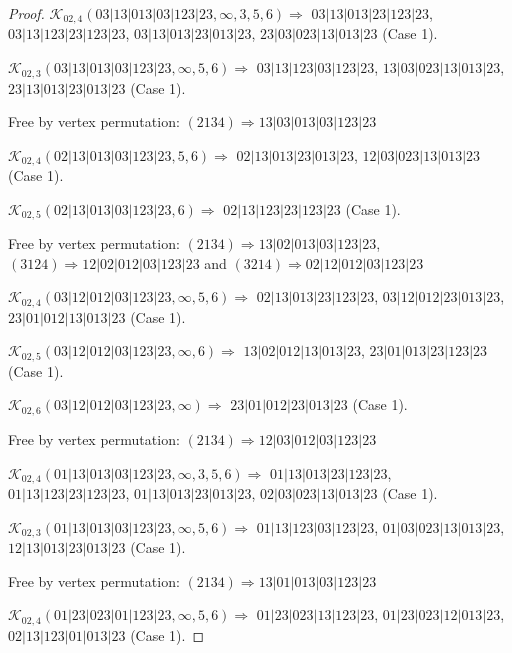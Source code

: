 \documentclass[12pt]{article}
\theoremstyle{plain}
\theoremstyle{definition}
\theoremstyle{remark}
\newcommand{\fancy}[1]{\mathcal{#1}}
\def\K{\fancy{K}}
\begin{document}
\begin{proof}
	$\K_{02,4}(03|13|013|03|123|23,\infty,3, 5, 6)\Rightarrow $ $03|13|013|23|123|23$, $03|13|123|23|123|23$, $03|13|013|23|013|23$, $23|03|023|13|013|23$ (Case 1).
	
	$\K_{02,3}(03|13|013|03|123|23,\infty,5, 6)\Rightarrow $ $03|13|123|03|123|23$, $13|03|023|13|013|23$, $23|13|013|23|013|23$ (Case 1).
	
	
	
	Free by vertex permutation: $(2 1 3 4)\Rightarrow 13|03|013|03|123|23$
	
	
	
	\bigskip
	
	$\K_{02,4}(02|13|013|03|123|23,5, 6)\Rightarrow $ $02|13|013|23|013|23$, $12|03|023|13|013|23$ (Case 1).
	
	$\K_{02,5}(02|13|013|03|123|23,6)\Rightarrow $ $02|13|123|23|123|23$ (Case 1).
	
	
	
	Free by vertex permutation: $(2 1 3 4)\Rightarrow 13|02|013|03|123|23$, $(3 1 2 4)\Rightarrow 12|02|012|03|123|23$ and $(3 2 1 4)\Rightarrow 02|12|012|03|123|23$
	
	
	
	\bigskip
	
	$\K_{02,4}(03|12|012|03|123|23,\infty,5, 6)\Rightarrow $ $02|13|013|23|123|23$, $03|12|012|23|013|23$, $23|01|012|13|013|23$ (Case 1).
	
	$\K_{02,5}(03|12|012|03|123|23,\infty,6)\Rightarrow $ $13|02|012|13|013|23$, $23|01|013|23|123|23$ (Case 1).
	
	$\K_{02,6}(03|12|012|03|123|23,\infty)\Rightarrow $ $23|01|012|23|013|23$ (Case 1).
	
	
	
	Free by vertex permutation: $(2 1 3 4)\Rightarrow 12|03|012|03|123|23$
	
	
	
	\bigskip
	
	$\K_{02,4}(01|13|013|03|123|23,\infty,3, 5, 6)\Rightarrow $ $01|13|013|23|123|23$, $01|13|123|23|123|23$, $01|13|013|23|013|23$, $02|03|023|13|013|23$ (Case 1).
	
	$\K_{02,3}(01|13|013|03|123|23,\infty,5, 6)\Rightarrow $ $01|13|123|03|123|23$, $01|03|023|13|013|23$, $12|13|013|23|013|23$ (Case 1).
	
	
	
	Free by vertex permutation: $(2 1 3 4)\Rightarrow 13|01|013|03|123|23$
	
	
	
	\bigskip
	
	$\K_{02,4}(01|23|023|01|123|23,\infty,5, 6)\Rightarrow $ $01|23|023|13|123|23$, $01|23|023|12|013|23$, $02|13|123|01|013|23$ (Case 1).
	

\end{proof}
\end{document}
